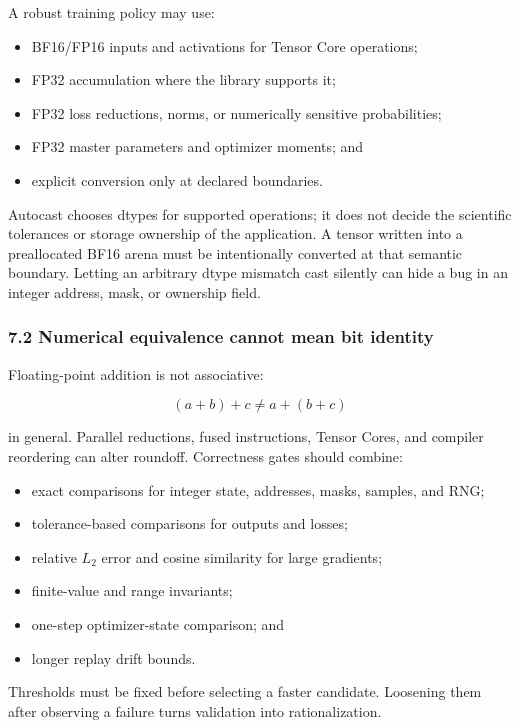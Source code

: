 \documentclass[
  10pt,
  letterpaper,
]{article}
\providecommand{\tightlist}{%
  \setlength{\itemsep}{0pt}\setlength{\parskip}{0pt}}
\begin{document}
A robust training policy may use:

\begin{itemize}
\tightlist
\item
  BF16/FP16 inputs and activations for Tensor Core operations;
\item
  FP32 accumulation where the library supports it;
\item
  FP32 loss reductions, norms, or numerically sensitive probabilities;
\item
  FP32 master parameters and optimizer moments; and
\item
  explicit conversion only at declared boundaries.
\end{itemize}

Autocast chooses dtypes for supported operations; it does not decide the
scientific tolerances or storage ownership of the application. A tensor
written into a preallocated BF16 arena must be intentionally converted
at that semantic boundary. Letting an arbitrary dtype mismatch cast
silently can hide a bug in an integer address, mask, or ownership field.

\subsubsection{7.2 Numerical equivalence cannot mean bit
identity}\label{72-numerical-equivalence-cannot-mean-bit-identity}

Floating-point addition is not associative:

\[
(a+b)+c \ne a+(b+c)
\]

in general. Parallel reductions, fused instructions, Tensor Cores, and
compiler reordering can alter roundoff. Correctness gates should
combine:

\begin{itemize}
\tightlist
\item
  exact comparisons for integer state, addresses, masks, samples, and
  RNG;
\item
  tolerance-based comparisons for outputs and losses;
\item
  relative \(L_2\) error and cosine similarity for large gradients;
\item
  finite-value and range invariants;
\item
  one-step optimizer-state comparison; and
\item
  longer replay drift bounds.
\end{itemize}

Thresholds must be fixed before selecting a faster candidate. Loosening
them after observing a failure turns validation into rationalization.
\end{document}
